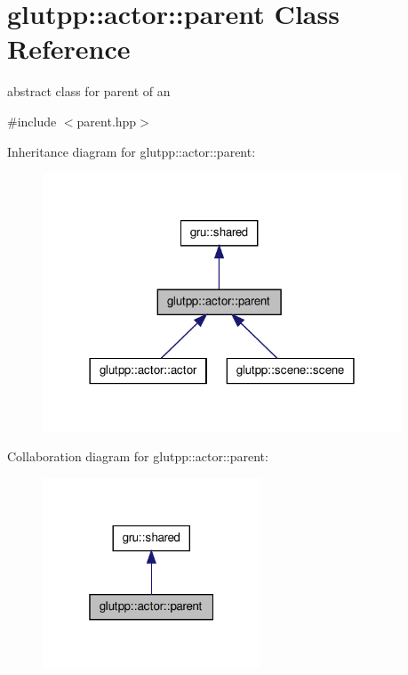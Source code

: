 \hypertarget{classglutpp_1_1actor_1_1parent}{\section{glutpp\-:\-:actor\-:\-:parent \-Class \-Reference}
\label{classglutpp_1_1actor_1_1parent}
}


abstract class for parent of an   




{\ttfamily \#include $<$parent.\-hpp$>$}



\-Inheritance diagram for glutpp\-:\-:actor\-:\-:parent\-:\nopagebreak
\begin{figure}[H]
\begin{center}
\leavevmode
\includegraphics[width=302pt]{classglutpp_1_1actor_1_1parent__inherit__graph}
\end{center}
\end{figure}


\-Collaboration diagram for glutpp\-:\-:actor\-:\-:parent\-:\nopagebreak
\begin{figure}[H]
\begin{center}
\leavevmode
\includegraphics[width=184pt]{classglutpp_1_1actor_1_1parent__coll__graph}
\end{center}
\end{figure}
